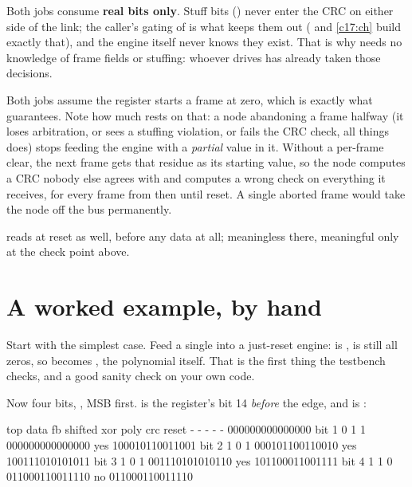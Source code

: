Both jobs consume \textbf{real bits only}. Stuff bits () never enter the CRC on
either side of the link; the caller's gating of  is what keeps them out
( and \ref{c17:ch} build exactly that), and the engine itself never knows they exist.
That is why  needs no knowledge of frame fields or stuffing: whoever drives 
has already taken those decisions.

Both jobs assume the register starts a frame at zero, which is exactly what  guarantees.
Note how much rests on that: a node abandoning a frame halfway (it loses arbitration, or sees a
stuffing violation, or fails the CRC check, all things  does) stops feeding the
engine with a \emph{partial} value in it. Without a per-frame clear, the next frame gets that residue
as its starting value, so the node computes a CRC nobody else agrees with and computes a wrong check
on everything it receives, for every frame from then until reset. A single aborted frame would take
the node off the bus permanently.

 reads  at reset as well, before any data at all; meaningless there, meaningful
only at the check point above.

\section{A worked example, by hand}
\label{c13:sec:worked}

Start with the simplest case. Feed a single  into a just-reset engine:  is
,  is still all zeros, so  becomes ,
the polynomial itself. That is the first thing the testbench checks, and a good sanity check on your
own code.

Now four bits, , MSB first.  is the register's bit 14 \emph{before} the edge,
and  is :

\begin{textdrawing}
         top  data  fb   shifted          xor poly   crc
reset      -     -   -   -                       -   000000000000000
bit 1      0     1   1   000000000000000       yes   100010110011001
bit 2      1     0   1   000101100110010       yes   100111010101011
bit 3      1     0   1   001110101010110       yes   101100011001111
bit 4      1     1   0   011000110011110        no   011000110011110
\end{textdrawing}

